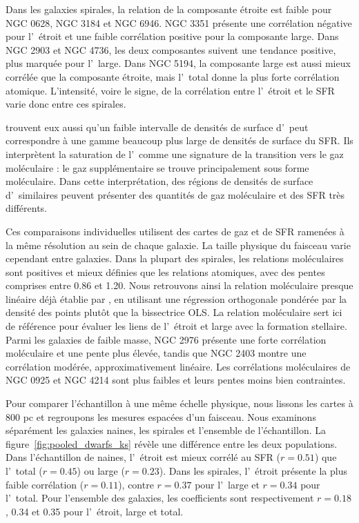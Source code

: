 Dans les galaxies spirales, la relation de la composante étroite est faible pour NGC 0628, NGC 3184 et NGC 6946. NGC 3351 présente une corrélation négative pour l'\HI\ étroit et une faible corrélation positive pour la composante large. Dans NGC 2903 et NGC 4736, les deux composantes suivent une tendance positive, plus marquée pour l'\HI\ large. Dans NGC 5194, la composante large est aussi mieux corrélée que la composante étroite, mais l'\HI\ total donne la plus forte corrélation atomique. L'intensité, voire le signe, de la corrélation entre l'\HI\ étroit et le SFR varie donc entre ces spirales.

\citet{Fbigiel2008} trouvent eux aussi qu'un faible intervalle de densités de surface d'\HI\ peut correspondre à une gamme beaucoup plus large de densités de surface du SFR. Ils interprètent la saturation de l'\HI\ comme une signature de la transition vers le gaz moléculaire : le gaz supplémentaire se trouve principalement sous forme moléculaire. Dans cette interprétation, des régions de densités de surface d'\HI\ similaires peuvent présenter des quantités de gaz moléculaire et des SFR très différents.

Ces comparaisons individuelles utilisent des cartes de gaz et de SFR ramenées à la même résolution au sein de chaque galaxie. La taille physique du faisceau varie cependant entre galaxies. Dans la plupart des spirales, les relations moléculaires sont positives et mieux définies que les relations atomiques, avec des pentes comprises entre 0.86 et 1.20. Nous retrouvons ainsi la relation moléculaire presque linéaire déjà établie par \citet{Fbigiel2008}, en utilisant une régression orthogonale pondérée par la densité des points plutôt que la bissectrice OLS. La relation moléculaire sert ici de référence pour évaluer les liens de l'\HI\ étroit et large avec la formation stellaire. Parmi les galaxies de faible masse, NGC 2976 présente une forte corrélation moléculaire et une pente plus élevée, tandis que NGC 2403 montre une corrélation modérée, approximativement linéaire. Les corrélations moléculaires de NGC 0925 et NGC 4214 sont plus faibles et leurs pentes moins bien contraintes.

Pour comparer l'échantillon à une même échelle physique, nous lissons les cartes à 800 pc et regroupons les mesures espacées d'un faisceau. Nous examinons séparément les galaxies naines, les spirales et l'ensemble de l'échantillon. La figure~\ref{fig:pooled_dwarfs_ks} révèle une différence entre les deux populations. Dans l'échantillon de naines, l'\HI\ étroit est mieux corrélé au SFR ($r=0.51$) que l'\HI\ total ($r=0.45$) ou large ($r=0.23$). Dans les spirales, l'\HI\ étroit présente la plus faible corrélation ($r=0.11$), contre $r=0.37$ pour l'\HI\ large et $r=0.34$ pour l'\HI\ total. Pour l'ensemble des galaxies, les coefficients sont respectivement $r=0.18$, 0.34 et 0.35 pour l'\HI\ étroit, large et total.


